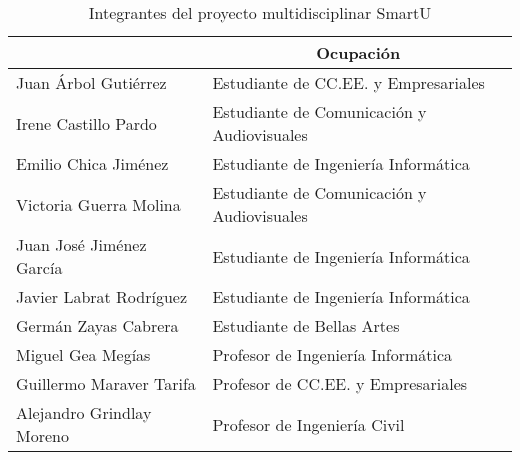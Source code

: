 \begin{table}
    \begin{center}
        \begin{tabular}{|p{4.5cm}|p{6.5cm}|}
            \hline
                \rowcolor{Gray}\multicolumn{1}{|c|}{\textbf{Integrante}}
                & \multicolumn{1}{|c|}{\textbf{Ocupación}} \\
            \hline
                Juan Árbol Gutiérrez & Estudiante de CC.EE. y Empresariales \\
            \hline
                Irene Castillo Pardo & Estudiante de Comunicación y Audiovisuales \\
            \hline
                Emilio Chica Jiménez & Estudiante de Ingeniería Informática \\
            \hline
                Victoria Guerra Molina & Estudiante de Comunicación y Audiovisuales \\
            \hline
                Juan José Jiménez García & Estudiante de Ingeniería Informática \\
            \hline
                Javier Labrat Rodríguez & Estudiante de Ingeniería Informática \\
            \hline
                Germán Zayas Cabrera & Estudiante de Bellas Artes \\
            \hline
                Miguel Gea Megías & Profesor de Ingeniería Informática \\
            \hline
                Guillermo Maraver Tarifa & Profesor de CC.EE. y Empresariales \\
            \hline
                Alejandro Grindlay Moreno & Profesor de Ingeniería Civil \\
            \hline
        \end{tabular}
        \caption{Integrantes del proyecto multidisciplinar SmartU}
        \label{miembrossmartu}
    \end{center}
\end{table}
